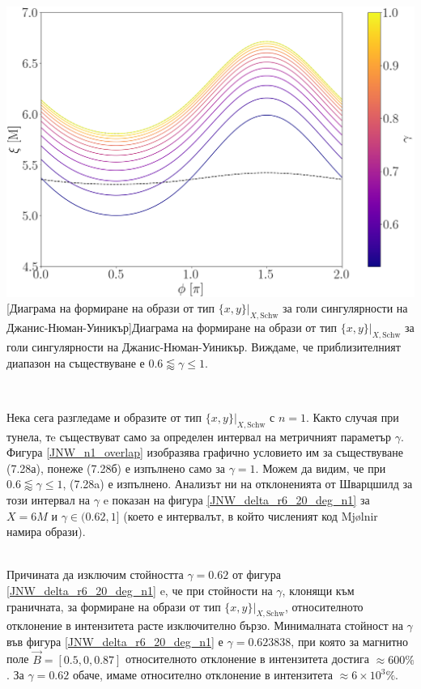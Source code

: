 \begin{minipage}{16em}
	\hspace{-0.3cm}
	\includegraphics[scale = 0.18]{JNW_indirect_overlap_grapth.png}
	[Диаграма на формиране на образи от тип $\{x,y\}\vert_{X, \text{Schw}}$ за голи сингулярности на Джанис-Нюман-Уиникър]{\small Диаграма на формиране на образи от тип $\{x,y\}\vert_{X, \text{Schw}}$ за голи сингулярности на Джанис-Нюман-Уиникър. Виждаме, че приблизителният диапазон на съществуване е $0.6 \lessapprox \gamma \le 1$.} 
	\label{JNW_n1_overlap}
\end{minipage}\,\,
\begin{minipage}{20em}
	Нека сега разгледаме и образите от тип $\{x,y\}\vert_{X, \text{Schw}}$ с $n = 1$. Както случая при тунела, тe съществуват само за определен интервал на метричният параметър $\gamma$. Фигура \ref{JNW_n1_overlap} изобразява графично условието им за съществуване (7.28а), понеже (7.28б) е изпълнено само за $\gamma = 1$. Можем да видим, че при  $0.6 \lessapprox \gamma \le 1$, (7.28a) е изпълнено. Анализът ни на отклоненията от Шварцшилд за този интервал на $\gamma$ e показан на фигура \ref{JNW_delta_r6_20_deg_n1} за $X = 6M$ и $\gamma\in(0.62, 1]$ (което е интервалът, в който численият код Mjølnir намира образи).
\end{minipage}\\

Причината да изключим стойността $\gamma = 0.62$ от фигура \ref{JNW_delta_r6_20_deg_n1} e, че при стойности на $\gamma$, клонящи към граничната, за формиране на образи от тип $\{x,y\}\vert_{X, \text{Schw}}$, относителното отклонение в интензитета расте изключително бързо. Минималната стойност на $\gamma$ във фигура \ref{JNW_delta_r6_20_deg_n1} е $\gamma = 0.623838$, при която за магнитно поле $\vec{B} = [0.5, 0, 0.87]$ относителното отклонение в интензитета достига $\approx 600\%$. За $\gamma = 0.62$ обаче, имаме относително отклонение в интензитета $\approx 6\times 10^3 \%$.\\

